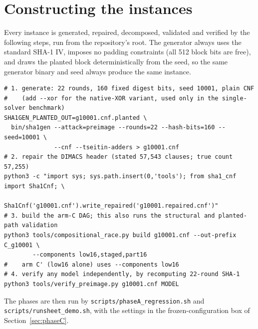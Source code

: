 \documentclass[11pt,a4paper]{article}
\begin{document}
\section{Constructing the instances}\label{app:repro}
Every instance is generated, repaired, decomposed, validated and verified by the following steps,
run from the repository's root. The generator always uses the standard SHA-1 IV, imposes no padding
constraints (all 512 block bits are free), and draws the planted block deterministically from the
seed, so the same generator binary and seed always produce the same instance.
{\footnotesize\begin{verbatim}
# 1. generate: 22 rounds, 160 fixed digest bits, seed 10001, plain CNF
#    (add --xor for the native-XOR variant, used only in the single-solver benchmark)
SHA1GEN_PLANTED_OUT=g10001.cnf.planted \
  bin/sha1gen --attack=preimage --rounds=22 --hash-bits=160 --seed=10001 \
              --cnf --tseitin-adders > g10001.cnf
# 2. repair the DIMACS header (stated 57,543 clauses; true count 57,255)
python3 -c "import sys; sys.path.insert(0,'tools'); from sha1_cnf import Sha1Cnf; \
            Sha1Cnf('g10001.cnf').write_repaired('g10001.repaired.cnf')"
# 3. build the arm-C DAG; this also runs the structural and planted-path validation
python3 tools/compositional_race.py build g10001.cnf --out-prefix C_g10001 \
        --components low16,staged,part16
#    arm C' (low16 alone) uses --components low16
# 4. verify any model independently, by recomputing 22-round SHA-1
python3 tools/verify_preimage.py g10001.cnf MODEL
\end{verbatim}}
The phases are then run by \texttt{scripts/phaseA\_regression.sh} and
\texttt{scripts/runsheet\_demo.sh}, with the settings in the frozen-configuration box of
Section~\ref{sec:phaseC}.

\end{document}
